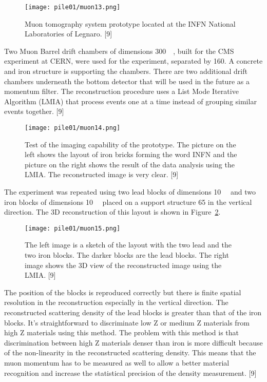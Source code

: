 \documentclass[twocolumn,a4paper]{article}
\begin{document}
\begin{figure}
  \texttt{[image: pile01/muon13.png]}
  \caption{Muon tomography system prototype located at the INFN
    National Laboratories of Legnaro. [9]}
  \label{fig:muon13}
\end{figure}

Two Muon Barrel drift chambers of dimensions
\unit{300}{\cubic{\centi\metre}}, built for the CMS
experiment at CERN, were used for the experiment, separated by
\unit{160}{\centi\metre}. A concrete and iron structure is supporting
the chambers. There are two additional drift chambers underneath the
bottom detector that will be used in the future as a momentum
filter. The reconstruction procedure uses a List Mode Iterative
Algorithm (LMIA) that process events one at a time instead of grouping
similar events together. [9]

\begin{figure}
  \texttt{[image: pile01/muon14.png]}
  \caption{Test of the imaging capability of the prototype. The
    picture on the left shows the layout of iron bricks forming the
    word INFN and the picture on the right shows the result of the
    data analysis using the LMIA. The reconstructed image is very
    clear. [9]}
\end{figure}

The experiment was repeated using two lead blocks of dimensions
\unit{10}{\cubic{\centi\metre}} and two iron blocks of
dimensions \unit{10}{\cubic{\centi\metre}} placed on a
support structure \unit{65}{\centi\metre} in the vertical
direction. The 3D reconstruction of this layout is shown in
Figure~\ref{fig:muon15}.

\begin{figure}
  \texttt{[image: pile01/muon15.png]}
  \caption{The left image is a sketch of the layout with the two lead
    and the two iron blocks. The darker blocks are the lead
    blocks. The right image shows the 3D view of the reconstructed
    image using the LMIA. [9]}
  \label{fig:muon15}
\end{figure}

The position of the blocks is reproduced correctly but there is finite
spatial resolution in the reconstruction especially in the vertical
direction. The reconstructed scattering density of the lead blocks is
greater than that of the iron blocks. It’s straightforward to
discriminate low Z or medium Z materials from high Z materials using
this method. The problem with this method is that discrimination
between high Z materials denser than iron is more difficult because of
the non-linearity in the reconstructed scattering density. This means
that the muon momentum has to be measured as well to allow a better
material recognition and increase the statistical precision of the
density measurement. [9]
\end{document}
